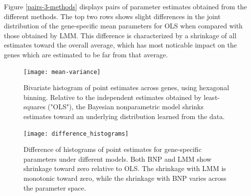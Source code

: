 {Figure \ref{pairs-3-methods} displays pairs of parameter estimates obtained from the different methods. The top two rows shows slight differences in the joint distribution of the gene-specific mean parameters for OLS when compared with those obtained by LMM. This difference is characterized by a shrinkage of all estimates toward the overall average, which has most noticable impact on the genes which are estimated to be far from that average.

\begin{figure}[ht]
\centering
\texttt{[image: mean-variance]}
\caption{\small Bivariate histogram of point estimates across genes, using hexagonal binning. Relative to the independent estimates obtained by least-squares ("OLS"), the Bayesian nonparametric model shrinks estimates toward an underlying distribution learned from the data.}
\label{mean-variance}
\end{figure}

\begin{figure}[ht]
\centering
\texttt{[image: difference\_histograms]}
\caption{\small Difference of histograms of point estimates for gene-specific parameters under different models. Both BNP and LMM show shrinkage toward zero relative to OLS. The shrinkage with LMM is monotonic toward zero, while the shrinkage with BNP varies across the parameter space.}
\label{diff-hist}
\end{figure}


}

